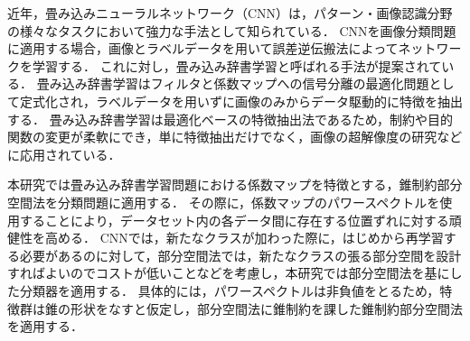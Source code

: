 近年，畳み込みニューラルネットワーク（CNN）は，パターン・画像認識分野の様々なタスクにおいて強力な手法として知られている．
CNNを画像分類問題に適用する場合，画像とラベルデータを用いて誤差逆伝搬法によってネットワークを学習する．
これに対し，畳み込み辞書学習と呼ばれる手法が提案されている\cite{fast-csc}．
畳み込み辞書学習はフィルタと係数マップへの信号分離の最適化問題として定式化され，ラベルデータを用いずに画像のみからデータ駆動的に特徴を抽出する．
畳み込み辞書学習は最適化ベースの特徴抽出法であるため，制約や目的関数の変更が柔軟にでき，単に特徴抽出だけでなく，画像の超解像度の研究\cite{super-res}などに応用されている．

本研究では畳み込み辞書学習問題における係数マップを特徴とする，錐制約部分空間法を分類問題に適用する．
その際に，係数マップのパワースペクトルを使用することにより，データセット内の各データ間に存在する位置ずれに対する頑健性を高める．
CNNでは，新たなクラスが加わった際に，はじめから再学習する必要があるのに対して，部分空間法では，新たなクラスの張る部分空間を設計すればよいのでコストが低いことなどを考慮し，本研究では部分空間法を基にした分類器を適用する．
具体的には，パワースペクトルは非負値をとるため，特徴群は錐の形状をなすと仮定し，部分空間法に錐制約を課した錐制約部分空間法を適用する．
